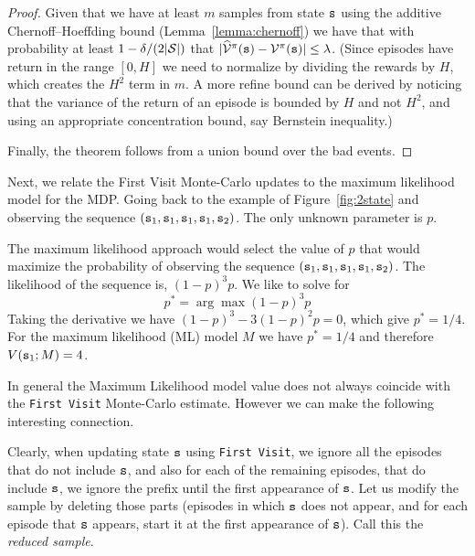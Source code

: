 \begin{advanced}
\begin{proof}
Given that we have at least $m$ samples from state ${\tt s}$ using
the additive Chernoff--Hoeffding bound (Lemma~\ref{lemma:chernoff})
we have that with probability at least $1-\delta/(2|\mathcal{S}|)$ that
$|\widehat{\mathcal{V}}^\pi({\tt s})-\mathcal{V}^\pi({\tt s})|\leq
\lambda$. (Since episodes have return in the range $[0,H]$ we need
to normalize by dividing the rewards by $H$, which creates the $H^2$
term in $m$. A more refine bound can be derived by noticing that the
variance of the return of an episode is bounded by $H$ and not
$H^2$, and using an appropriate concentration bound, say Bernstein
inequality.)

Finally, the theorem follows from a union bound over the bad events.
\end{proof}


Next, we relate the First Visit Monte-Carlo updates to the maximum
likelihood model for the MDP. Going back to the example of
Figure~\ref{fig:2state} and observing the sequence
$({\tt s}_1,{\tt s}_1,{\tt s}_1,{\tt s}_1,{\tt s}_2)$. The only unknown
parameter is $p$.

The maximum likelihood approach would select the value of $p$ that
would maximize the probability of observing the sequence
$({\tt s}_1,{\tt s}_1,{\tt s}_1,{\tt s}_1,{\tt s}_2)$. The likelihood of
the sequence is, $(1-p)^3p$. We like to solve for
\[
p^* = \arg\max (1-p)^3 p
\]
Taking the derivative we have $(1-p)^3-3(1-p)^2p=0$, which give
$p^*=1/4$.
%
For the maximum likelihood (ML) model $M$ we have $p^*=1/4$ and
therefore $V({\tt s}_1;M)=4$.

In general the Maximum Likelihood model value does not always
coincide with the {\tt First Visit} Monte-Carlo estimate. However we
can make the following interesting connection.

Clearly, when updating state ${\tt s}$ using {\tt First Visit}, we
ignore all the episodes that do not include ${\tt s}$, and also for
each of the remaining episodes, that do include ${\tt s}$, we ignore the
prefix until the first appearance of ${\tt s}$. Let us modify the
sample by deleting those parts (episodes in which ${\tt s}$ does not
appear, and for each episode that ${\tt s}$ appears, start it at the
first appearance of ${\tt s}$). Call this the {\em reduced sample}.



\end{advanced}
